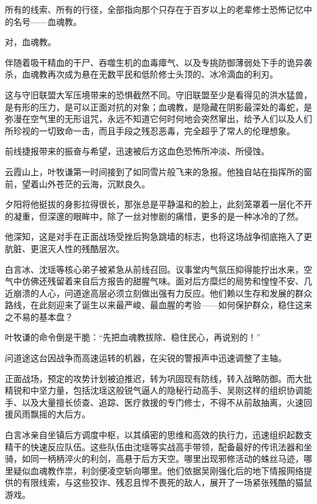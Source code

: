 所有的线索、所有的行径，全部指向那个只存在于百岁以上的老辈修士恐怖记忆中的名号——血魂教。

对，血魂教。

伴随着吸干精血的干尸、吞噬生机的血毒瘴气、以及专挑防御薄弱处下手的诡异袭杀，血魂教再次成为悬在无数平民和低阶修士头顶的、冰冷滴血的利刃。

这与守旧联盟大军压境带来的恐惧截然不同。守旧联盟至少是看得见的洪水猛兽，是有形的压力，是可以正面对抗的对象；血魂教，是隐藏在阴影最深处的毒蛇，是弥漫在空气里的无形诅咒，永远不知道它何时何地会突然窜出，给予人们以及人们所珍视的一切致命一击，而且手段之残忍恶毒，完全超乎了常人的伦理想象。

前线捷报带来的振奋与希望，迅速被后方这血色恐怖所冲淡、所侵蚀。

云霞山上，叶牧谦第一时间接到了如同雪片般飞来的急报。他独自站在指挥所的窗前，望着山外苍茫的云海，沉默良久。

夕阳将他挺拔的身影拉得很长，那张总是平静温和的脸上，此刻笼罩着一层化不开的凝重，但深邃的眼眸中，除了一丝对惨剧的痛惜，更多的是一种冰冷的了然。

他深知，这是对手在正面战场受挫后狗急跳墙的标志，也将这场战争彻底拖入了更肮脏、更泯灭人性的残酷层次。

白言冰、沈瑶等核心弟子被紧急从前线召回。议事堂内气氛压抑得能拧出水来，空气中仿佛还残留着来自后方报告的甜腥气味。面对后方糜烂的局势和惶惶不安、几近崩溃的人心，问道途高层必须立刻做出强有力反应。他们赖以生存和发展的群众路线，在此刻迎来了诞生以来最严峻、最血腥的考验——如何保护群众，稳住这来之不易的基本盘？

叶牧谦的命令倒是干脆：“先把血魂教拔除、稳住民心，再说别的！”

\vspace{2em}

问道途这台因战争而高速运转的机器，在尖锐的警报声中迅速调整了主轴。

正面战场，预定的攻势计划被迫推迟，转为巩固现有防线，转入战略防御。而大批精锐和中坚力量，包括沈瑶这般锐气逼人的隐秘行动高手、吴刚这样的组织协调能手、以及大量擅长侦查、追踪、医疗救援的专门修士，不得不从前敌抽离，火速回援风雨飘摇的大后方。

白言冰亲自坐镇后方调度中枢，以其缜密的思维和高效的执行力，迅速组织起数支精干的快速反应队伍。这些队伍由沈瑶等实战高手带领，配备最好的传讯法器和坐骑，如同一柄柄淬火的利剑，高悬于后方天空。哪里出现邪修活动的蛛丝马迹，哪里疑似血魂教作祟，利剑便凌空斩向哪里。他们依据吴刚强化后的地下情报网络提供的有限线索，与这些狡诈、残忍且悍不畏死的敌人，展开了一场紧张残酷的猫鼠游戏。

